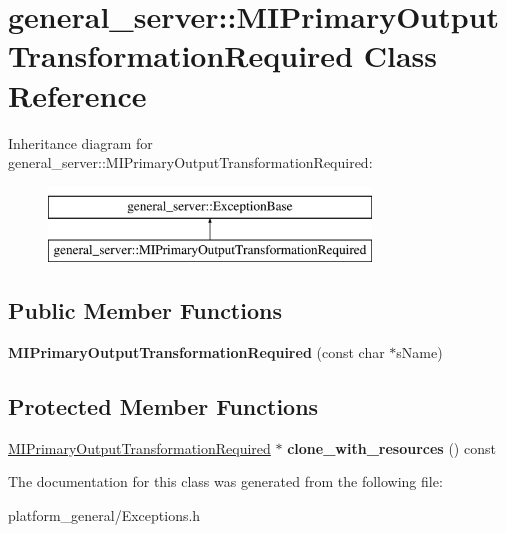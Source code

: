 \hypertarget{classgeneral__server_1_1MIPrimaryOutputTransformationRequired}{\section{general\-\_\-server\-:\-:\-M\-I\-Primary\-Output\-Transformation\-Required \-Class \-Reference}
\label{classgeneral__server_1_1MIPrimaryOutputTransformationRequired}
}
\-Inheritance diagram for general\-\_\-server\-:\-:\-M\-I\-Primary\-Output\-Transformation\-Required\-:\begin{figure}[H]
\begin{center}
\leavevmode
\includegraphics[height=2.000000cm]{classgeneral__server_1_1MIPrimaryOutputTransformationRequired}
\end{center}
\end{figure}
\subsection*{\-Public \-Member \-Functions}
\begin{DoxyCompactItemize}
\item 
\hypertarget{classgeneral__server_1_1MIPrimaryOutputTransformationRequired_a6575dadc89569d4f075f14daa6cd1f61}{{\bfseries \-M\-I\-Primary\-Output\-Transformation\-Required} (const char $\ast$s\-Name)}\label{classgeneral__server_1_1MIPrimaryOutputTransformationRequired_a6575dadc89569d4f075f14daa6cd1f61}

\end{DoxyCompactItemize}
\subsection*{\-Protected \-Member \-Functions}
\begin{DoxyCompactItemize}
\item 
\hypertarget{classgeneral__server_1_1MIPrimaryOutputTransformationRequired_ac2362f4ca17da143f4a248402c4b6477}{\hyperlink{classgeneral__server_1_1MIPrimaryOutputTransformationRequired}{\-M\-I\-Primary\-Output\-Transformation\-Required} $\ast$ {\bfseries clone\-\_\-with\-\_\-resources} () const }\label{classgeneral__server_1_1MIPrimaryOutputTransformationRequired_ac2362f4ca17da143f4a248402c4b6477}

\end{DoxyCompactItemize}


\-The documentation for this class was generated from the following file\-:\begin{DoxyCompactItemize}
\item 
platform\-\_\-general/\-Exceptions.\-h\end{DoxyCompactItemize}
